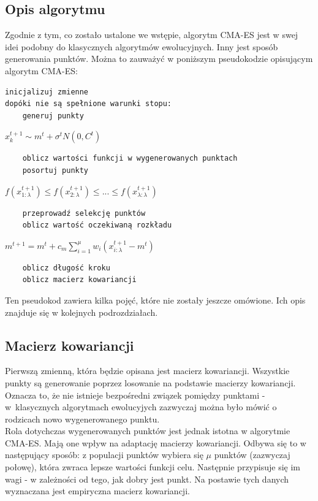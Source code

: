 \documentclass{mini}
\begin{document}
\subsection{Opis algorytmu}
Zgodnie z tym, co zostało ustalone we wstępie, algorytm CMA-ES jest w swej idei podobny do klasycznych algorytmów ewolucyjnych. Inny jest sposób generowania punktów. Można to zauważyć w poniższym pseudokodzie opisującym algorytm CMA-ES:
\begin{Verbatim}
inicjalizuj zmienne
dopóki nie są spełnione warunki stopu:
	generuj punkty
\end{Verbatim}
\hspace{12ex} $x_k^{t+1} \sim m^t + \sigma^tN(0,C^t)$
\begin{Verbatim}
	oblicz wartości funkcji w wygenerowanych punktach
	posortuj punkty
\end{Verbatim}
\hspace{12ex} $f(x_{1:\lambda}^{t+1}) \leq f(x_{2:\lambda}^{t+1}) \leq ... \leq f(x_{\lambda:\lambda}^{t+1})$
\begin{Verbatim}
	przeprowadź selekcję punktów
	oblicz wartość oczekiwaną rozkładu
\end{Verbatim}
\hspace{12ex} $m^{t+1}=m^t+c_m\sum\limits_{i=1}^\mu w_i(x_{i:\lambda}^{t+1}-m^t)$
\begin{Verbatim}
	oblicz długość kroku
	oblicz macierz kowariancji
\end{Verbatim}
Ten pseudokod zawiera kilka pojęć, które nie zostały jeszcze omówione. Ich opis znajduje się w kolejnych podrozdziałach.

\subsection{Macierz kowariancji}
Pierwszą zmienną, która będzie opisana jest macierz kowariancji. Wszystkie punkty są generowanie poprzez losowanie na podstawie macierzy kowariancji. Oznacza to, że nie istnieje bezpośredni związek pomiędzy punktami - w~klasycznych algorytmach ewolucyjych zazwyczaj można było mówić o rodzicach nowo wygenerowanego punktu.\\
Rola dotychczas wygenerowanych punktów jest jednak istotna w algorytmie CMA-ES. Mają one wpływ na adaptację macierzy kowariancji. Odbywa się to w następujący sposób: z populacji punktów wybiera się $\mu$ punktów (zazwyczaj połowę), która zwraca lepsze wartości funkcji celu. Następnie przypisuje się im wagi - w zależności od tego, jak dobry jest punkt. Na postawie tych danych wyznaczana jest empiryczna macierz kowariancji.
\end{document}
